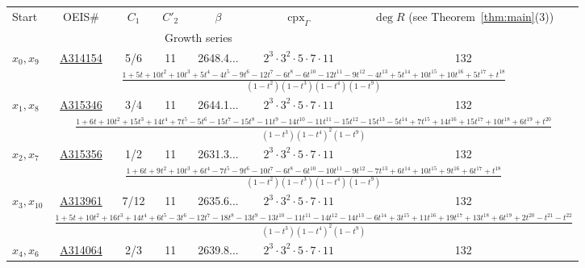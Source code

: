 \documentclass[11pt]{article}
\theoremstyle{definition}
\numberwithin{equation}{section}
\begin{document}
\renewcommand{\arraystretch}{1.8}
\begin{table}[htp]

\vspace{5mm}

\centering
\begin{sideways}
\begin{tabular}{l||cccccc} \hline
\multirow{2}{*}{Start} & OEIS\# & $C_1$ & $C'_2$ & $\beta$ & $\operatorname{cpx}_{\Gamma}$ & $\deg R$ (see Theorem~\ref{thm:main}(3))  \\
& \multicolumn{5}{c}{Growth series} \\
\hline \hline
\multirow{2}{*}{$x_0, x_9$} & \underline{A314154} & 5/6 & 11 & 2648.4... & $2^3 \cdot 3^2 \cdot 5 \cdot 7 \cdot 11$ & 132 \\
& \multicolumn{6}{c}{\Large $\frac{1+5 t+10 t^{2}+10 t^{3}+5 t^{4}-4 t^{5}-9 t^{6}-12 t^{7}-6 t^{8}-6 t^{10}-12 t^{11}-9 t^{12}-4 t^{13}+5 t^{14}+10 t^{15}+10 t^{16}+5 t^{17}+t^{18}}{(1 - t^2)(1-t^3)(1-t^4)(1-t^9)}$} \\
\hline
\multirow{2}{*}{$x_1, x_8$} & \underline{A315346} & 3/4 & 11 & 2644.1... & $2^3 \cdot 3^2 \cdot 5 \cdot 7 \cdot 11$ & 132 \\
& \multicolumn{6}{c}{\Large $\frac{1+6 t+10 t^{2}+15 t^{3}+14 t^{4}+7 t^{5}-5 t^{6}-15 t^{7}-15 t^{8}-11 t^{9}-14 t^{10}-11 t^{11}-15 t^{12}-15 t^{13}-5 t^{14}+7 t^{15}+14 t^{16}+15 t^{17}+10 t^{18}+6 t^{19}+t^{20}}{(1 - t^3)(1 - t^4)^2(1-t^9)}$} \\
\hline
\multirow{2}{*}{$x_2, x_7$} & \underline{A315356} & 1/2 & 11 & 2631.3... & $2^3 \cdot 3^2 \cdot 5 \cdot 7 \cdot 11$ & 132 \\
& \multicolumn{6}{c}{\Large $\frac{1+6 t+9 t^{2}+10 t^{3}+6 t^{4}-7 t^{5}-9 t^{6}-10 t^{7}-6 t^{8}-6 t^{10}-10 t^{11}-9 t^{12}-7 t^{13}+6 t^{14}+10 t^{15}+9 t^{16}+6 t^{17}+t^{18}}{(1 - t^2)(1-t^3)(1-t^4)(1-t^9)}$} \\
\hline
\multirow{2}{*}{$x_3, x_{10}$} & \underline{A313961} & 7/12 & 11 & 2635.6... & $2^3 \cdot 3^2 \cdot 5 \cdot 7 \cdot 11$ & 132 \\
& \multicolumn{6}{c}{\Large $\frac{1+5 t+10 t^{2}+16 t^{3}+14 t^{4}+6 t^{5}-3 t^{6}-12 t^{7}-18 t^{8}-13 t^{9}-13 t^{10}-11 t^{11}-14 t^{12}-14 t^{13}-6 t^{14}+3 t^{15}+11 t^{16}+19 t^{17}+13 t^{18}+6 t^{19}+2 t^{20}-t^{21}-t^{22}}{(1 - t^3)(1 - t^4)^2(1-t^9)}$} \\
\hline
\multirow{2}{*}{$x_4, x_6$} & \underline{A314064} & 2/3 & 11 & 2639.8... & $2^3 \cdot 3^2 \cdot 5 \cdot 7 \cdot 11$ & 132 \\

\end{tabular}
\end{sideways}
\end{table}
\end{document}
